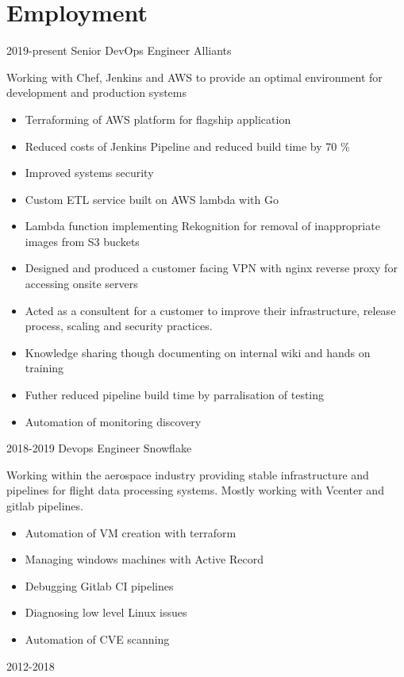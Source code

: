 \documentclass[]{friggeri-cv-a4}
\begin{document}
\section{Employment}
 \begin{entrylist}
  \entry
  	{2019-present}
  	{Senior DevOps Engineer}
  	{Alliants}
  	{Working with Chef, Jenkins and AWS to provide an optimal environment for development and production systems
      \begin{itemize}
        \item Terraforming of AWS platform for flagship application
        \item Reduced costs of Jenkins Pipeline and reduced build time by 70 \%
        \item Improved systems security
        \item Custom ETL service built on AWS lambda with Go
        \item Lambda function implementing Rekognition for removal of inappropriate images from S3 buckets
        \item Designed and produced a customer facing VPN with nginx reverse proxy for accessing onsite servers
        \item Acted as a consultent for a customer to improve their infrastructure, release process, scaling and security practices. 
        \item Knowledge sharing though documenting on internal wiki and hands on training
        \item Futher reduced pipeline build time by parralisation of testing
        \item Automation of monitoring discovery
      \end{itemize}}
  \entry 
  	{2018-2019}
  	{Devops Engineer}
  	{Snowflake}
  	{
      Working within the aerospace industry providing stable infrastructure and pipelines for flight data processing systems. Mostly working with Vcenter and gitlab pipelines.
      \begin{itemize}
        \item Automation of VM creation with terraform
        \item Managing windows machines with Active Record
        \item Debugging Gitlab CI pipelines
        \item Diagnosing low level Linux issues
        \item Automation of CVE scanning
      \end{itemize}
    }
  \entry
  	{2012-2018}

\end{entrylist}
\end{document}
